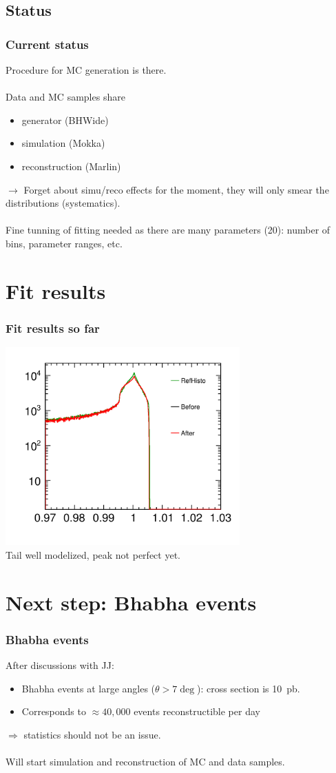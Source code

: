\documentclass{beamer}
\begin{document}
\subsection{Status}
\begin{frame}
\frametitle{Current status}
Procedure for MC generation is there.\\
~\\
Data and MC samples share 
\begin{itemize}
  \item generator (BHWide)
  \item simulation (Mokka)
  \item reconstruction (Marlin)
\end{itemize}
$\to$ Forget about simu/reco effects for the moment, they will only smear
the distributions (systematics).\\
~\\
Fine tunning of fitting needed as there are many parameters (20): number of
bins, parameter ranges, etc.
\end{frame}


\section{Fit results}
\begin{frame}
\frametitle{Fit results so far}
\centering
\includegraphics[width=9cm]{HistoGrams}\\
Tail well modelized, peak not perfect yet.
\end{frame}

\section{Next step: Bhabha events}
\begin{frame}
\frametitle{Bhabha events}
After discussions with JJ:
\begin{itemize}
  \item Bhabha events at large angles ($\theta > 7\deg$): cross section is
  10~pb.
  \item Corresponds to $\approx 40,000$ events reconstructible per day
\end{itemize}
$\Rightarrow$ statistics should not be an issue.\\
~\\
Will start simulation and reconstruction of MC and data samples.
\end{frame}
\end{document}
